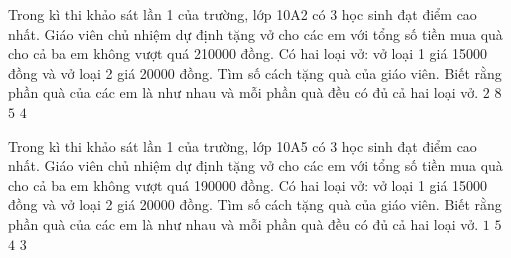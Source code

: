 \begin{ex}
 Trong kì thi khảo sát lần 1 của trường, lớp 10A2 có 3 học sinh đạt điểm cao nhất. Giáo viên chủ nhiệm dự định tặng vở cho các em với tổng số tiền mua quà cho cả ba em không vượt quá 210000 đồng. Có hai loại vở: vở loại 1 giá 15000 đồng và vở loại 2 giá 20000 đồng. Tìm số cách tặng quà của giáo viên. Biết rằng phần quà của các em là như nhau và mỗi phần quà đều có đủ cả hai loại vở.
\choice
{${2}$}
{${8}$}
{\True ${5}$}
{${4}$}
\end{ex}

\begin{ex}
 Trong kì thi khảo sát lần 1 của trường, lớp 10A5 có 3 học sinh đạt điểm cao nhất. Giáo viên chủ nhiệm dự định tặng vở cho các em với tổng số tiền mua quà cho cả ba em không vượt quá 190000 đồng. Có hai loại vở: vở loại 1 giá 15000 đồng và vở loại 2 giá 20000 đồng. Tìm số cách tặng quà của giáo viên. Biết rằng phần quà của các em là như nhau và mỗi phần quà đều có đủ cả hai loại vở.
\choice
{${1}$}
{${5}$}
{${4}$}
{\True ${3}$}
\end{ex}

